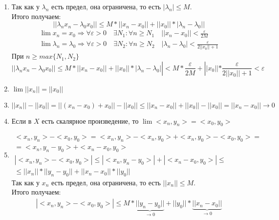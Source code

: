 \documentclass[12pt,letterpaper]{report}
\makeatletter
\theoremstyle{definition}
\renewenvironment{proof}[1][\proofname]{%
   \par\pushQED{\qed}\normalfont%
   \topsep6\p@\@plus6\p@\relax
   \trivlist\item[\hskip\labelsep\bfseries#1\@addpunct{.}]%
   \ignorespaces
}{%
   \popQED\endtrivlist\@endpefalse
}
\makeatother
\begin{document}
\begin{enumerate}
\begin{proof}
                Так как у $\lambda_n$ есть предел, она ограничена, то есть $|\lambda_n| \leqslant M$. \\
                Итого получаем:
                \[ || \lambda_nx_n - \lambda_0x_0 || \leqslant M*||x_n - x_0|| + ||x_0||*|\lambda_n - \lambda_0|| \]
                \begin{gather*}
                    \lim x_n = x_0 \Rightarrow \forall \varepsilon > 0 \quad \exists N_1 : \forall n \geqslant N_1 \quad ||x_n - x_0|| < \frac{\varepsilon}{2M} \\
                    \lim \lambda_n = \lambda_0 \Rightarrow \forall \varepsilon > 0 \quad \exists N_2 : \forall n \geqslant N_2 \quad |\lambda_n - \lambda_0| < \frac{\varepsilon}{2||x_0||+1}
                \end{gather*}
                При $n \geqslant max\{N_1, N_2\}$
                \[|| \lambda_nx_n - \lambda_0x_0 || \leqslant M*||x_n - x_0|| + ||x_0||*|\lambda_n - \lambda_0|| < M * \frac{\varepsilon}{2M} + ||x_0|| * \frac{\varepsilon}{2||x_0||+1} < \varepsilon\]
        \end{proof}
        \item $\lim ||x_n|| = ||x_0||$
        \begin{proof}
                \[ ||x_n|| - ||x_0|| = ||(x_n - x_0) + x_0|| - ||x_0|| \leqslant ||x_n - x_0|| + ||x_0|| - ||x_0|| = ||x_n - x_0|| \to 0 \]
        \end{proof}
        \item Если в $X$ есть скалярное произведение, то $\lim<x_n, y_n> = <x_0, y_0>$
        \begin{proof}
            \begin{gather*}
                <x_n, y_n> - <x_0, y_0> = <x_n, y_n> - <x_n, y_0> + <x_n, y_0> - <x_0, y_0> =  \\
                = <x_n, y_n - y_0> + <x_n - x_0, y_0> \\
                | <x_n, y_n> - <x_0, y_0> | \leqslant | <x_n, y_n - y_0> | + | <x_n - x_0, y_0> | \leqslant \\
                \leqslant ||x_n||*||y_n-y_0||+||x_n-x_0||*||y_0||
            \end{gather*}
            Так как у $x_n$ есть предел, она ограничена, то есть $||x_n|| \leqslant M$. \\
            Итого получаем:
            \begin{gather*}
                | <x_n, y_n> - <x_0, y_0> | \leqslant M*\underbrace{||y_n - y_0||}_{\to 0}+||y_0||*\underbrace{||x_n - x_0||}_{\to 0}
            \end{gather*}
        \end{proof}
    \end{enumerate}
\end{document}
